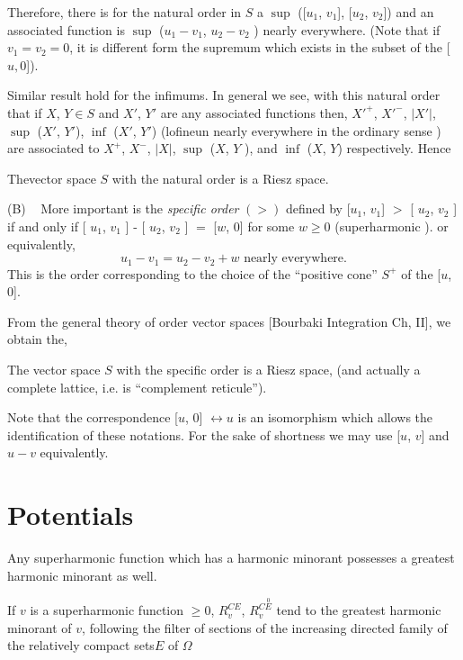 Therefore, there is for the natural order in $S$ a $\sup$ ([$u_1$,
  $v_1$], [$u_2$, $v_2$]) and an associated function is $\sup$ ($u_1 -
v_1$, $u_2 - v_2$ )  nearly everywhere. (Note that if $v_1 = v_2 = 0
$, it is different form the supremum which exists in the subset of the
[$u,0$]). 

Similar result hold for the infimums. In general we see, with this
natural order that if $X$, $Y \in S$ and $X'$, $Y' $ are any associated
functions then, $X'^{+}$, $X'^-$, $|X'|$, $\sup$ ($X'$, $Y'$), $\inf$
($X'$, $Y'$) (lofineun nearly everywhere in the ordinary sense ) are
associated to $ X^+$, $X^-$, $|X|$, $\sup$ ($X$, $Y$ ), and $\inf$
($X$, $Y$) respectively. Hence  

\begin{prop}\label{p4:chap4:sec19:prop7}%
  The\pageoriginale vector space $S$ with the natural order is a Riesz space. 

  (B) ~ More important is the {\em specific order } $(> )$ defined by
  [$u_1$, $v_1$] $>$ [ $u_2$, $v_2$ ] if and only if [ $u_1$, $v_1$ ]
  - [ $u_2$, $v_2$ ] $=$ [$w$, $0$]  for some $w \geq 0 $ (superharmonic
  ). or equivalently,  
  $$
  u_1 - v_1 = u_2 - v_2 + w  \text{ nearly everywhere}.  
  $$
  This  is the order corresponding to the choice of the ``positive
  cone'' $S^+ $ of the [$u$, $0$].  
\end{prop}

From the general theory of order vector spaces [Bourbaki Integration
  Ch, II], we obtain the,  

\begin{thm}\label{p4:chap4:sec19:thm13} %
  The vector space $S$ with the specific order is a Riesz space, (and
  actually a complete lattice, i.e. is ``complement reticule''). 
\end{thm}

Note that the correspondence [$u$, $0$] $\leftrightarrow u $ is an
isomorphism which allows the identification of these notations. For
the sake of shortness we may use [$u$, $v$] and $u-v$ equivalently.  

\section{Potentials}\label{p4:chap4:sec20} %

Any superharmonic function which has a harmonic minorant possesses a
greatest harmonic minorant as well.  

\begin{prop}\label{p4:chap4:sec20:prop8} %
  If $v$ is a superharmonic function $\geq 0$, $R^{CE}_v $,
  $R_v^{C\overset{0}E}$ tend to the greatest harmonic minorant of $v$,
  following the filter of sections of the increasing directed family of
  the relatively compact sets\pageoriginale $E$ of $\Omega$ 
\end{prop}

